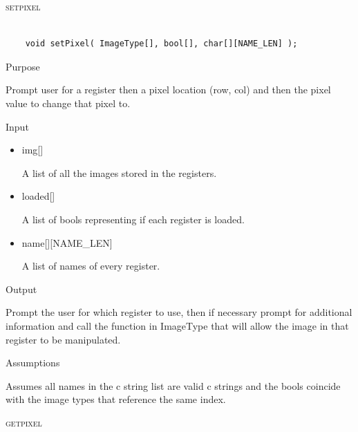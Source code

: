 \documentclass[pdftex, 11pt]{article}
\begin{document}
\begin{description}
\begin{description}
		\end{description}



	\item{\textsc{setpixel}}

		\begin{lstlisting}

	void setPixel( ImageType[], bool[], char[][NAME_LEN] );
		\end{lstlisting}

		\begin{description}
			\item{Purpose}

				Prompt user for a register then a pixel location (row, col) and then the pixel
				value to change that pixel to.

			\item{Input}

				\begin{itemize}

					\item{img[]}

						A list of all the images stored in the registers.

					\item{loaded[]}

						A list of bools representing if each register is loaded.

					\item{name[][NAME\_LEN]}

						A list of names of every register.

				\end{itemize}

			\item{Output}

				Prompt the user for which register to use, then if necessary
				prompt for additional information and call the function
				in ImageType that will allow the image in that register to
				be manipulated.

			\item{Assumptions}

				Assumes all names in the c string list are valid c
				strings and the bools coincide with the image types that
				reference the same index.

		\end{description}



	\item{\textsc{getpixel}}


\end{description}
\end{document}
